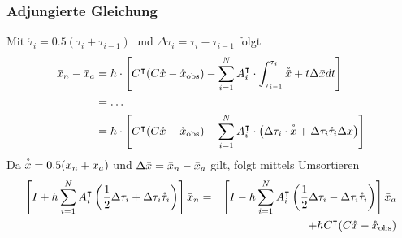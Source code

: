 \begin{frame}[<+->]
\frametitle{Adjungierte Gleichung}
Mit  $\mathring \tau_i = 0.5 (\tau_i +\tau_{i-1})$ und $\Delta \tau_i = \tau_i-\tau_{i-1}$ folgt
\pause
\begin{align}
\bar{x}_n - \bar{x}_a &= h\cdot \left[C^\intercal(C\mathring{x} -\mathring x_\text{obs}) - \sum_{i=1}^N A_i^\intercal \cdot \int_{\tau_{i-1}}^{\tau_{i}} \mathring {\bar{x}} + t\Delta \bar{x} dt\right]\\
		  &= \ldots\\
		  &= h\cdot \left[C^\intercal(C\mathring{x} -\mathring x_\text{obs}) - \sum_{i=1}^N A_i^\intercal \cdot \left( \Delta \tau_i\cdot \mathring {\bar{x}} +  \Delta \tau_i \mathring \tau_i \Delta \bar{x} \right)\right]
\end{align}
\pause
Da $\mathring {\bar{x}} = 0.5(\bar{x}_n + \bar{x}_a)$ und $\Delta \bar{x} = \bar{x}_n-\bar{x}_a$ gilt, folgt mittels Umsortieren
\[
\begin{aligned}
\left[I +h\sum_{i=1}^N A_i^\intercal \left(\frac{1}{2} \Delta \tau_i +\Delta \tau_i \mathring \tau_i\right) \right]\bar{x}_n &= 
&\left[I - h\sum_{i=1}^N A_i^\intercal  \left(\frac{1}{2}\Delta \tau_i-\Delta \tau_i \mathring \tau_i\right)\right]\bar{x}_a \\
&&+h C^\intercal(C\mathring{x} -\mathring x_\text{obs})
\end{aligned}
\]
\end{frame}


